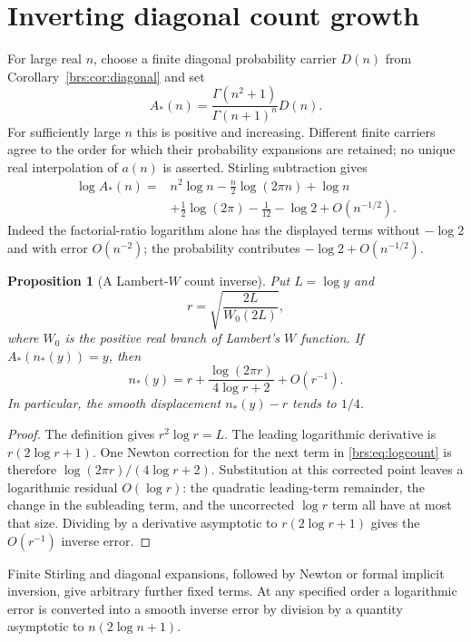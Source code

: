 \documentclass[11pt]{article}
\numberwithin{equation}{section}
\newtheorem{proposition}[theorem]{Proposition}
\theoremstyle{remark}\newtheorem{remark}[theorem]{Remark}
\begin{document}
\section{Inverting diagonal count growth}

For large real $n$, choose a finite diagonal probability carrier $D(n)$
from Corollary~\ref{brs:cor:diagonal} and set
\[
 A_*(n)=\frac{\Gamma(n^2+1)}{\Gamma(n+1)^n}D(n).
\]
For sufficiently large $n$ this is positive and increasing.  Different
finite carriers agree to the order for which their probability
expansions are retained; no unique real interpolation of $a(n)$ is
asserted.  Stirling subtraction gives
\begin{align}\label{brs:eq:logcount}
 \log A_*(n)={}&n^2\log n-\frac n2\log(2\pi n)+\log n\\
 &+\frac12\log(2\pi)-\frac1{12}-\log2+O(n^{-1/2}).\nonumber
\end{align}
Indeed the factorial-ratio logarithm alone has the displayed terms
without $-\log2$ and with error $O(n^{-2})$; the probability contributes
$-\log2+O(n^{-1/2})$.

\begin{proposition}[A Lambert-$W$ count inverse]\label{brs:prop:countinverse}
Put $L=\log y$ and
\[
 r=\sqrt{\frac{2L}{W_0(2L)}},
\]
where $W_0$ is the positive real branch of Lambert's $W$ function.  If
$A_*(n_*(y))=y$, then
\begin{equation}\label{brs:eq:inversecount}
 n_*(y)=r+\frac{\log(2\pi r)}{4\log r+2}+O(r^{-1}).
\end{equation}
In particular, the smooth displacement $n_*(y)-r$ tends to $1/4$.
\end{proposition}
\begin{proof}
The definition gives $r^2\log r=L$.  The leading logarithmic derivative
is $r(2\log r+1)$.  One Newton correction for the next term in
\eqref{brs:eq:logcount} is therefore
$\log(2\pi r)/(4\log r+2)$.  Substitution at this corrected point leaves
a logarithmic residual $O(\log r)$: the quadratic leading-term remainder,
the change in the subleading term, and the uncorrected $\log r$ term
all have at most that size.  Dividing by a derivative asymptotic to
$r(2\log r+1)$ gives the $O(r^{-1})$ inverse error.
\end{proof}

Finite Stirling and diagonal expansions, followed by Newton or formal
implicit inversion, give arbitrary further fixed terms.  At any specified
order a logarithmic error is converted into a smooth inverse error by
division by a quantity asymptotic to $n(2\log n+1)$.
\end{document}
